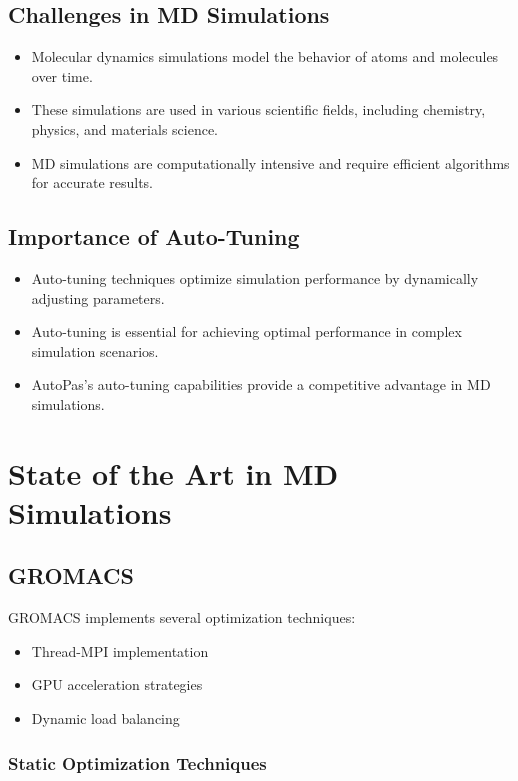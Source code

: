 \documentclass[conference]{IEEEtran}
\begin{document}
\subsection{Challenges in MD Simulations}

\begin{itemize}
    \item Molecular dynamics simulations model the behavior of atoms and molecules over time.
    \item These simulations are used in various scientific fields, including chemistry, physics, and materials science.
    \item MD simulations are computationally intensive and require efficient algorithms for accurate results.
\end{itemize}

\subsection{Importance of Auto-Tuning}
\begin{itemize}
    \item Auto-tuning techniques optimize simulation performance by dynamically adjusting parameters.
    \item Auto-tuning is essential for achieving optimal performance in complex simulation scenarios.
    \item AutoPas's auto-tuning capabilities provide a competitive advantage in MD simulations.
\end{itemize}

\section{State of the Art in MD Simulations}


\subsection{GROMACS}
GROMACS implements several optimization techniques:

\begin{itemize}
    \item Thread-MPI implementation
    \item GPU acceleration strategies
    \item Dynamic load balancing
\end{itemize}

\subsubsection{Static Optimization Techniques}
\end{document}
